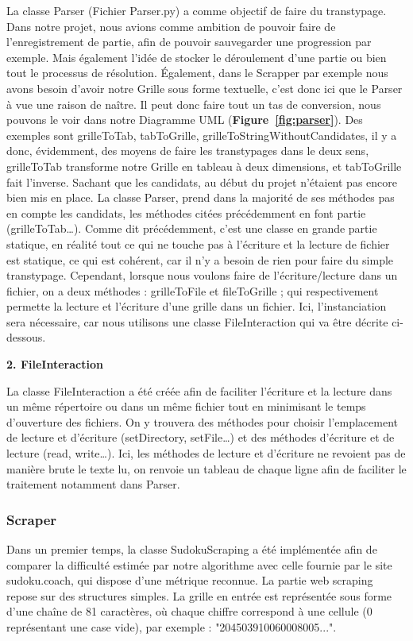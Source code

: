 \documentclass[a4paper]{article}
\begin{document}
La classe Parser (Fichier Parser.py) a comme objectif de faire du transtypage. Dans notre projet, nous avions comme ambition de pouvoir faire de l’enregistrement de partie, afin de pouvoir sauvegarder une progression par exemple. Mais également l’idée de stocker le déroulement d’une partie ou bien tout le processus de résolution. Également, dans le Scrapper par exemple nous avons besoin d’avoir notre Grille sous forme textuelle, c’est donc ici que le Parser à vue une raison de naître. Il peut donc faire tout un tas de conversion, nous pouvons le voir dans notre Diagramme UML (\textbf{Figure~\ref{fig:parser}}). 
Des exemples sont grilleToTab, tabToGrille, grilleToStringWithoutCandidates, il y a donc, évidemment, des moyens de faire les transtypages dans le deux sens, grilleToTab transforme notre Grille en tableau à deux dimensions, et tabToGrille fait l’inverse. Sachant que les candidats, au début du projet n’étaient pas encore bien mis en place. 
La classe Parser, prend dans la majorité de ses méthodes pas en compte les candidats, les méthodes citées précédemment en font partie (grilleToTab…). Comme dit précédemment, c’est une classe en grande partie statique, en réalité tout ce qui ne touche pas à l’écriture et la lecture de fichier est statique, ce qui est cohérent, car il n’y a besoin de rien pour faire du simple transtypage. 
Cependant, lorsque nous voulons faire de l’écriture/lecture dans un fichier, on a deux méthodes : grilleToFile et fileToGrille ; qui respectivement permette la lecture et l’écriture d’une grille dans un fichier. Ici, l’instanciation sera nécessaire, car nous utilisons une classe FileInteraction qui va être décrite ci-dessous.

\textbf{2. FileInteraction}

La classe FileInteraction a été créée afin de faciliter l’écriture et la lecture dans un même répertoire ou dans un même fichier tout en minimisant le temps d’ouverture des fichiers. On y trouvera des méthodes pour choisir l’emplacement de lecture et d’écriture (setDirectory, setFile…) et des méthodes d’écriture et de lecture (read, write…). Ici, les méthodes de lecture et d’écriture ne revoient pas de manière brute le texte lu, on renvoie un tableau de chaque ligne afin de faciliter le traitement notamment dans Parser.


\subsubsection{Scraper}
Dans un premier temps, la classe SudokuScraping a été implémentée afin de comparer la difficulté estimée par notre algorithme avec celle fournie par le site sudoku.coach, qui dispose d’une métrique reconnue.
La partie web scraping repose sur des structures simples. La grille en entrée est représentée sous forme d’une chaîne de 81 caractères, où chaque chiffre correspond à une cellule (0 représentant une case vide), par exemple : "204503910060008005...".
\end{document}
